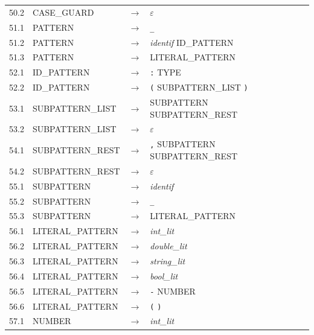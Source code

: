 \documentclass[11pt,a4paper]{article}
\begin{document}
{\begin{longtable}{r l c >{\raggedright\arraybackslash}p{6.6cm} >{\raggedright\arraybackslash}p{3.2cm}}
50.2 & \textsf{CASE\_GUARD} & $\rightarrow$ & $\varepsilon$ & {\scriptsize } \\
51.1 & \textsf{PATTERN} & $\rightarrow$ & \texttt{\_} & {\scriptsize } \\
51.2 & \textsf{PATTERN} & $\rightarrow$ & \textit{identif} \textsf{ID\_PATTERN} & {\scriptsize } \\
51.3 & \textsf{PATTERN} & $\rightarrow$ & \textsf{LITERAL\_PATTERN} & {\scriptsize } \\
52.1 & \textsf{ID\_PATTERN} & $\rightarrow$ & \texttt{:} \textsf{TYPE} & {\scriptsize } \\
52.2 & \textsf{ID\_PATTERN} & $\rightarrow$ & \texttt{(} \textsf{SUBPATTERN\_LIST} \texttt{)} & {\scriptsize } \\
53.1 & \textsf{SUBPATTERN\_LIST} & $\rightarrow$ & \textsf{SUBPATTERN} \textsf{SUBPATTERN\_REST} & {\scriptsize } \\
53.2 & \textsf{SUBPATTERN\_LIST} & $\rightarrow$ & $\varepsilon$ & {\scriptsize } \\
54.1 & \textsf{SUBPATTERN\_REST} & $\rightarrow$ & \texttt{,} \textsf{SUBPATTERN} \textsf{SUBPATTERN\_REST} & {\scriptsize } \\
54.2 & \textsf{SUBPATTERN\_REST} & $\rightarrow$ & $\varepsilon$ & {\scriptsize } \\
55.1 & \textsf{SUBPATTERN} & $\rightarrow$ & \textit{identif} & {\scriptsize } \\
55.2 & \textsf{SUBPATTERN} & $\rightarrow$ & \texttt{\_} & {\scriptsize } \\
55.3 & \textsf{SUBPATTERN} & $\rightarrow$ & \textsf{LITERAL\_PATTERN} & {\scriptsize } \\
56.1 & \textsf{LITERAL\_PATTERN} & $\rightarrow$ & \textit{int\_lit} & {\scriptsize } \\
56.2 & \textsf{LITERAL\_PATTERN} & $\rightarrow$ & \textit{double\_lit} & {\scriptsize } \\
56.3 & \textsf{LITERAL\_PATTERN} & $\rightarrow$ & \textit{string\_lit} & {\scriptsize } \\
56.4 & \textsf{LITERAL\_PATTERN} & $\rightarrow$ & \textit{bool\_lit} & {\scriptsize } \\
56.5 & \textsf{LITERAL\_PATTERN} & $\rightarrow$ & \texttt{-} \textsf{NUMBER} & {\scriptsize } \\
56.6 & \textsf{LITERAL\_PATTERN} & $\rightarrow$ & \texttt{(} \texttt{)} & {\scriptsize } \\
57.1 & \textsf{NUMBER} & $\rightarrow$ & \textit{int\_lit} & {\scriptsize } \\

\end{longtable}}
\end{document}
